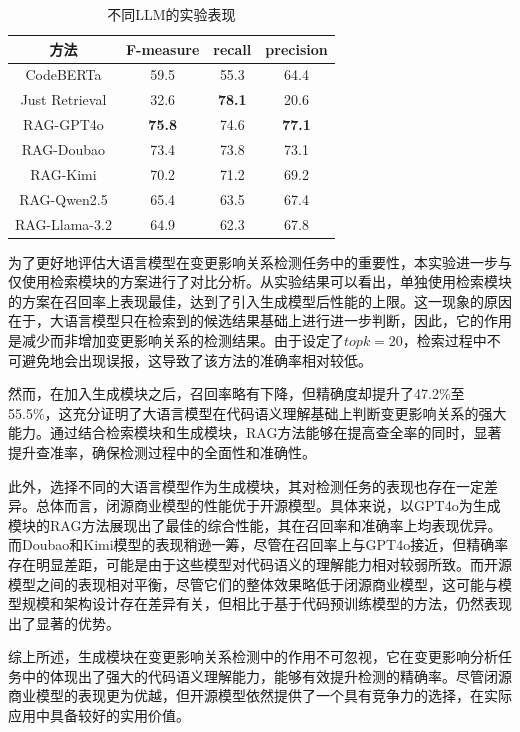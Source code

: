 \begin{table}[htbp]
\caption{不同LLM的实验表现}
\label{2_不同LLM的实验表现}
\vspace{0.5em}\centering\wuhao
\begin{tabular}{cccc}
\toprule
方法 & F-measure & recall & precision  \\
\midrule
CodeBERTa & 59.5 & 55.3 & 64.4 \\
Just Retrieval & 32.6 & \textbf{78.1} & 20.6 \\
\midrule
RAG-GPT4o & \textbf{75.8} & 74.6 & \textbf{77.1} \\
RAG-Doubao & 73.4 & 73.8 & 73.1 \\
RAG-Kimi & 70.2 & 71.2 & 69.2 \\
RAG-Qwen2.5 & 65.4 & 63.5 & 67.4 \\
RAG-Llama-3.2 & 64.9 & 62.3 & 67.8 \\
\bottomrule
\end{tabular}
\end{table}

为了更好地评估大语言模型在变更影响关系检测任务中的重要性，本实验进一步与仅使用检索模块的方案进行了对比分析。从实验结果可以看出，单独使用检索模块的方案在召回率上表现最佳，达到了引入生成模型后性能的上限。这一现象的原因在于，大语言模型只在检索到的候选结果基础上进行进一步判断，因此，它的作用是减少而非增加变更影响关系的检测结果。由于设定了$topk=20$，检索过程中不可避免地会出现误报，这导致了该方法的准确率相对较低。

然而，在加入生成模块之后，召回率略有下降，但精确度却提升了47.2\%至55.5\%，这充分证明了大语言模型在代码语义理解基础上判断变更影响关系的强大能力。通过结合检索模块和生成模块，RAG方法能够在提高查全率的同时，显著提升查准率，确保检测过程中的全面性和准确性。

此外，选择不同的大语言模型作为生成模块，其对检测任务的表现也存在一定差异。总体而言，闭源商业模型的性能优于开源模型。具体来说，以GPT4o为生成模块的RAG方法展现出了最佳的综合性能，其在召回率和准确率上均表现优异。而Doubao和Kimi模型的表现稍逊一筹，尽管在召回率上与GPT4o接近，但精确率存在明显差距，可能是由于这些模型对代码语义的理解能力相对较弱所致。而开源模型之间的表现相对平衡，尽管它们的整体效果略低于闭源商业模型，这可能与模型规模和架构设计存在差异有关，但相比于基于代码预训练模型的方法，仍然表现出了显著的优势。

综上所述，生成模块在变更影响关系检测中的作用不可忽视，它在变更影响分析任务中的体现出了强大的代码语义理解能力，能够有效提升检测的精确率。尽管闭源商业模型的表现更为优越，但开源模型依然提供了一个具有竞争力的选择，在实际应用中具备较好的实用价值。

